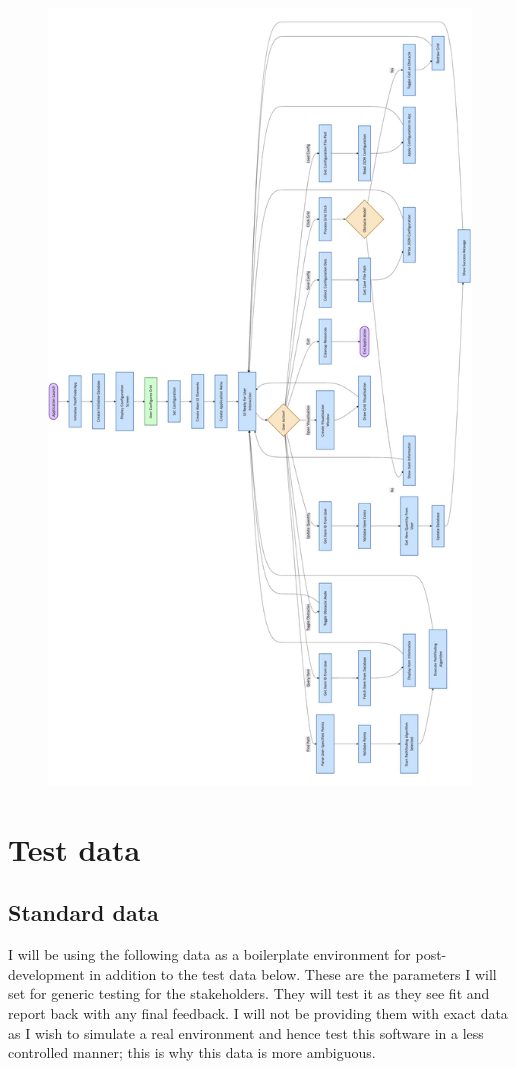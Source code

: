 \begin{figure}[htbp!]
    \centering
    \includegraphics[width=0.7\linewidth]{Flowcharts/Unified.png}

\end{figure}

\newpage

\section{Test data}

\subsection{Standard data}

I will be using the following data as a boilerplate environment for post-development in addition to the test data below. These are the parameters I will set for generic testing for the stakeholders. They will test it as they see fit and report back with any final feedback. I will not be providing them with exact data as I wish to simulate a real environment and hence test this software in a less controlled manner; this is why this data is more ambiguous.


